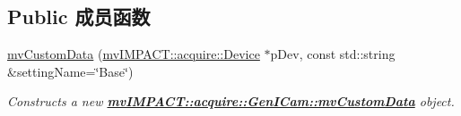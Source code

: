 \subsection*{Public 成员函数}
\begin{DoxyCompactItemize}
\item 
\hyperlink{classmv_i_m_p_a_c_t_1_1acquire_1_1_gen_i_cam_1_1mv_custom_data_a053591c4cbe43686dcdf7e8d66cbd938}{mv\+Custom\+Data} (\hyperlink{classmv_i_m_p_a_c_t_1_1acquire_1_1_device}{mv\+I\+M\+P\+A\+C\+T\+::acquire\+::\+Device} $\ast$p\+Dev, const std\+::string \&setting\+Name=\char`\"{}Base\char`\"{})
\begin{DoxyCompactList}\small\item\em Constructs a new {\bfseries \hyperlink{classmv_i_m_p_a_c_t_1_1acquire_1_1_gen_i_cam_1_1mv_custom_data}{mv\+I\+M\+P\+A\+C\+T\+::acquire\+::\+Gen\+I\+Cam\+::mv\+Custom\+Data}} object. \end{DoxyCompactList}\end{DoxyCompactItemize}
